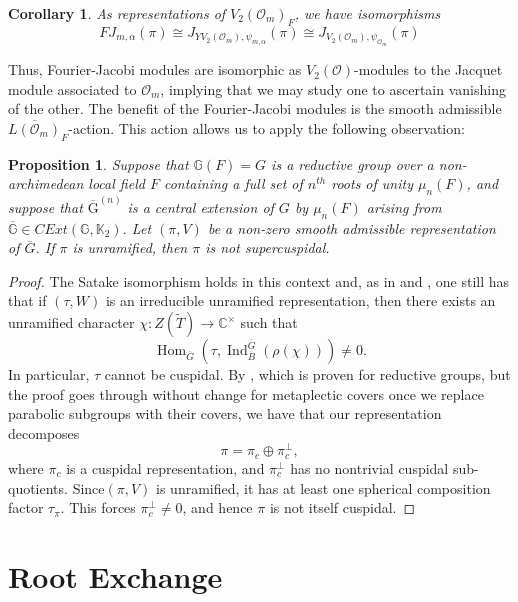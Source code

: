 \documentclass[11pt,reqno]{amsart}
\newtheorem{Prop}[Thm]{Proposition}
\newtheorem{Cor}[Thm]{Corollary}
\theoremstyle{definition}
\theoremstyle{remark}
\theoremstyle{definition}
\begin{document}
\begin{Cor}\label{Cor: local equiv}
As representations of $V_2({\mathcal{O}}_m)_F$, we have isomorphisms
\[
FJ_{m,{\alpha}}(\pi)\cong J_{YV_2({\mathcal{O}}_m),\psi_{m,{\alpha}}}(\pi) \cong J_{V_2({\mathcal{O}}_m),\psi_{{\mathcal{O}}_m}}(\pi)
\]
\end{Cor}
Thus, Fourier-Jacobi modules are isomorphic as $V_2({\mathcal{O}})$-modules to the Jacquet module associated to ${\mathcal{O}}_m$, implying that we may study one to ascertain vanishing of the other. The benefit of the Fourier-Jacobi modules is the smooth admissible $\overline{L({\mathcal{O}}_m)}_F$-action. This action allows us to apply the following observation:
\begin{Prop}\label{Prop: super unram}
Suppose that $\mathbb{G}(F) =G$ is a reductive group over a non-archimedean local field $F$ containing a full set of $n^{th}$ roots of unity $\mu_n(F)$, and suppose that ${\overline{\mathrm{G}}^{(n)}}$ is a central extension of $G$ by $\mu_n(F)$ arising from $\overline{\mathbb{G}}\in CExt(\mathbb{G},\mathbb{K}_2)$. Let $(\pi,V)$  be a non-zero smooth admissible representation of $\overline{G}$. If $\pi$ is unramified, then $\pi$ is not supercuspidal.
\end{Prop}

\begin{proof}
The Satake isomorphism holds in this context and, as in \cite{McN} and \cite{GG}, one still has that if $(\tau, W)$ is an irreducible unramified representation, then there exists an unramified character $\chi: Z(\tilde{T})\to {\mathbb C}^\times$ such that 
\[
\operatorname{Hom}_{\overline{G}}(\tau, \operatorname{Ind}^{\overline{G}}_{\overline{B}}(\rho(\chi)))\neq 0.
\]
In particular, $\tau$ cannot be cuspidal.
By \cite[Theorem 2.4.a]{BZ}, which is proven for reductive groups, but the proof goes through without change for metaplectic covers once we replace parabolic subgroups with their covers, we have that our representation decomposes 
\[
\pi = \pi_c\oplus \pi_c^\perp,
\] 
where $\pi_c$ is a cuspidal representation, and $\pi_c^\perp$ has no nontrivial cuspidal sub-quotients.  Since$(\pi,V)$ is unramified, it has at least one spherical composition factor $\tau_\pi$. This forces $\pi_c^{\perp}\neq 0$, and hence $\pi$ is not itself cuspidal. 
\end{proof}

\section{Root Exchange}\label{Section: Root Exchange}
\end{document}
